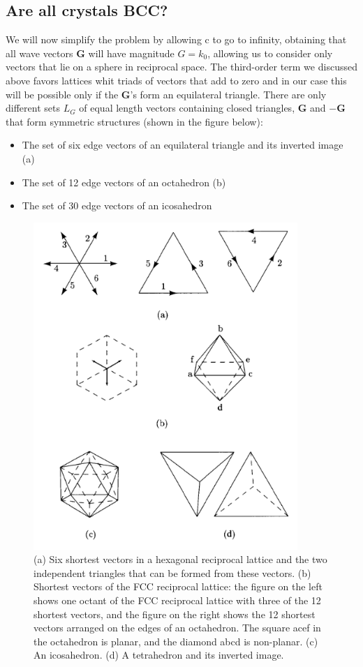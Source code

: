 \documentclass[12pt,a4paper]{article}
\begin{document}
\subsection{Are all crystals BCC?}
We will now simplify the problem by allowing c to go to infinity, obtaining that all wave vectors $\textbf{G}$ will have magnitude $G=k_0$, allowing us to consider only vectors that lie on a sphere in reciprocal space. The third-order term we discussed above favors lattices whit triads of vectors that add to zero and in our case this will be possible only if the $\textbf{G}$'s form an equilateral triangle. There are only different sets $L_G$ of equal length vectors containing closed triangles, $\textbf{G}$ and $-\textbf{G}$ that form symmetric structures (shown in the figure below):
\begin{itemize}
\item The set of six edge vectors of an equilateral triangle and its inverted image (a)
\item The set of 12 edge vectors of an octahedron (b)
\item The set of 30 edge vectors of an icosahedron
\end{itemize}
\begin{figure}[h!]
\begin{center}
\includegraphics[width=10cm]{robi.png}
\end{center}
\caption{(a) Six shortest vectors in a hexagonal reciprocal lattice and the two independent triangles that can be formed from these vectors. (b) Shortest vectors of the FCC reciprocal lattice: the figure on the left shows one octant of the FCC reciprocal lattice with three of the 12 shortest vectors, and the figure on the right shows the 12 shortest vectors arranged on the edges of an octahedron. The square acef in the octahedron is planar, and the diamond abcd is non-planar. (c) An icosahedron. (d) A tetrahedron and its inverted image.}
\label{fig:robi}
\end{figure}
\end{document}
